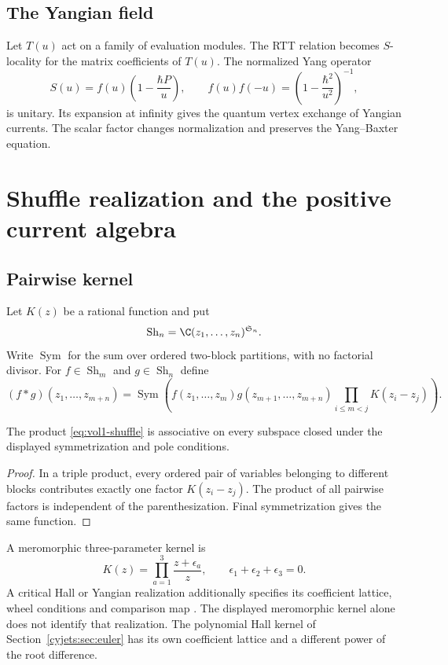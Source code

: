 \section{The Yangian field}
Let $T(u)$ act on a family of evaluation modules.  The RTT relation becomes $S$-locality for the matrix coefficients of $T(u)$.  The normalized Yang operator
\[
 S(u)=f(u)\left(1-\frac{\hbar P}{u}\right),
 \qquad
 f(u)f(-u)=\left(1-\frac{\hbar^2}{u^2}\right)^{-1},
\]
is unitary.  Its expansion at infinity gives the quantum vertex exchange of Yangian currents.  The scalar factor changes normalization and preserves the Yang--Baxter equation.

\chapter{Shuffle realization and the positive current algebra}
\section{Pairwise kernel}
Let $K(z)$ be a rational function and put
\[
 \operatorname{Sh}_n=\C(z_1,\ldots,z_n)^{\mathfrak S_n}.
\]
Write $\operatorname{Sym}$ for the sum over ordered two-block
partitions, with no factorial divisor.
For $f\in\operatorname{Sh}_m$ and $g\in\operatorname{Sh}_n$ define
\begin{equation}\label{eq:vol1-shuffle}
 (f*g)(z_1,\ldots,z_{m+n})
 =\operatorname{Sym}
 \left(
 f(z_1,\ldots,z_m)g(z_{m+1},\ldots,z_{m+n})
 \prod_{i\le m<j}K(z_i-z_j)
 \right).
\end{equation}

\begin{theorem}
The product \eqref{eq:vol1-shuffle} is associative on every subspace closed under the displayed symmetrization and pole conditions.
\end{theorem}
\begin{proof}
In a triple product, every ordered pair of variables belonging to different blocks contributes exactly one factor $K(z_i-z_j)$.  The product of all pairwise factors is independent of the parenthesization.  Final symmetrization gives the same function.
\end{proof}

A meromorphic three-parameter kernel is
\[
 K(z)=\prod_{a=1}^3\frac{z+\epsilon_a}{z},
 \qquad \epsilon_1+\epsilon_2+\epsilon_3=0.
\]
A critical Hall or Yangian realization additionally specifies its
coefficient lattice, wheel conditions and comparison map
\cite{SVYangians,Tsymbaliuk}.
The displayed meromorphic kernel alone does not identify that realization.
The polynomial Hall kernel of Section~\ref{cyjets:sec:euler} has its
own coefficient lattice and a different power of the root difference.

